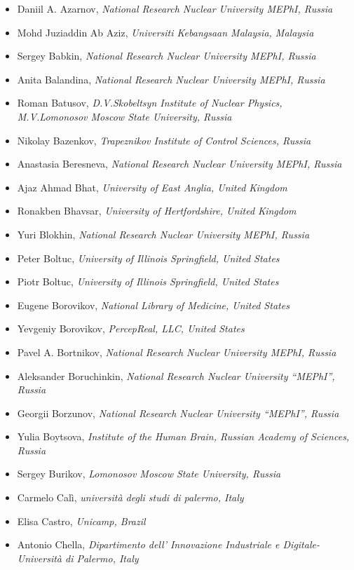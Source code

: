 \documentclass[10pt,fleqn,openany]{book} %
\begin{document}
\begin{itemize}
		\item Daniil A. Azarnov, \textit{National Research Nuclear University MEPhI, Russia}
		\item Mohd Juziaddin Ab Aziz, \textit{Universiti Kebangsaan Malaysia, Malaysia}
		\item Sergey Babkin, \textit{National Research Nuclear University MEPhI, Russia}
		\item Anita Balandina, \textit{National Research Nuclear University MEPhI, Russia}
		\item Roman Batusov, \textit{D.V.Skobeltsyn Institute of Nuclear Physics, M.V.Lomonosov Moscow State University, Russia}
		\item Nikolay Bazenkov, \textit{Trapeznikov Institute of Control Sciences, Russia}
		\item Anastasia Beresneva, \textit{National Research Nuclear University MEPhI, Russia}
		\item Ajaz Ahmad Bhat, \textit{University of East Anglia, United Kingdom}
		\item Ronakben Bhavsar, \textit{University of Hertfordshire, United Kingdom}
		\item Yuri Blokhin, \textit{National Research Nuclear University MEPhI, Russia}
		\item Peter Boltuc, \textit{University of Illinois Springfield, United States}
		\item Piotr Boltuc, \textit{University of Illinois Springfield, United States}
		\item Eugene Borovikov, \textit{National Library of Medicine, United States}
		\item Yevgeniy Borovikov, \textit{PercepReal, LLC, United States}
		\item Pavel A. Bortnikov, \textit{National Research Nuclear University MEPhI, Russia}
		\item Aleksander Boruchinkin, \textit{National Research Nuclear University ``MEPhI'', Russia}
		\item Georgii Borzunov, \textit{National Research Nuclear University ``MEPhI'', Russia}
		\item Yulia Boytsova, \textit{Institute of the Human Brain, Russian Academy of Sciences, Russia}
		\item Sergey Burikov, \textit{Lomonosov Moscow State University, Russia}
		\item Carmelo Calì, \textit{università degli studi di palermo, Italy}
		\item Elisa Castro, \textit{Unicamp, Brazil}
		\item Antonio Chella, \textit{Dipartimento dell' Innovazione Industriale e Digitale-Università di Palermo, Italy}

\end{itemize}
\end{document}
